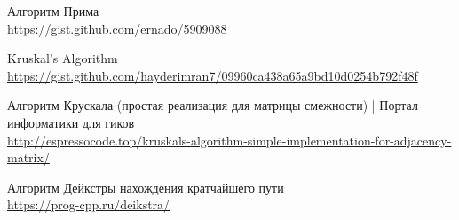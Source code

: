\newpage

\begin{thebibliography}{9}
        Алгоритм Прима
        \\\url{https://gist.github.com/ernado/5909088}
        
        Kruskal's Algorithm
        \\\url{https://gist.github.com/hayderimran7/09960ca438a65a9bd10d0254b792f48f}

        Алгоритм Крускала (простая реализация для матрицы смежности) | Портал информатики для гиков
        \\\url{http://espressocode.top/kruskals-algorithm-simple-implementation-for-adjacency-matrix/}

        Алгоритм Дейкстры нахождения кратчайшего пути
        \\\url{https://prog-cpp.ru/deikstra/}
\end{thebibliography}
